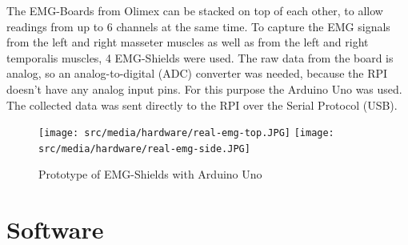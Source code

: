 The EMG-Boards from Olimex can be stacked on top of each other, to allow readings from up to 6 channels at the same time. To capture the EMG signals from the left and right masseter muscles as well as from the left and right temporalis muscles, 4 EMG-Shields were used. The raw data from the board is analog, so an analog-to-digital (ADC) converter was needed, because the RPI doesn't have any analog input pins. For this purpose the Arduino Uno was used. The collected data was sent directly to the RPI over the Serial Protocol (USB).


\begin{figure}[h!]
\centering
\texttt{[image: src/media/hardware/real-emg-top.JPG]}
\texttt{[image: src/media/hardware/real-emg-side.JPG]}
\caption{Prototype of EMG-Shields with Arduino Uno}
\label{image:real-emg}
\end{figure}


\section{Software}
\label{sec:software}